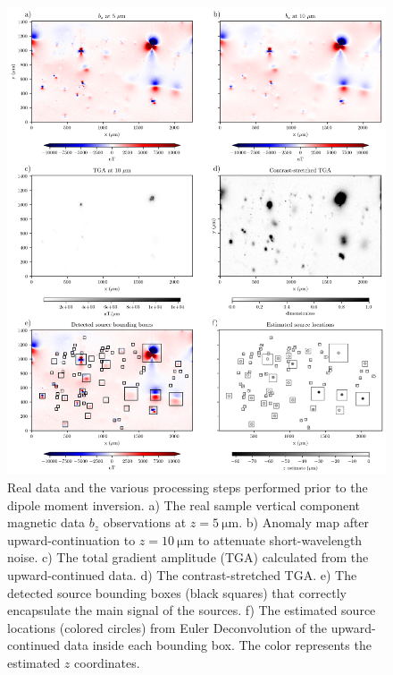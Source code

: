 \begin{figure}[ph!]
\centering
\includegraphics[width=1\linewidth]{figures/real-data.png}
\caption{Real data and the various processing steps performed prior to the dipole moment inversion.
    a) The real sample vertical component magnetic data $b_z$ observations at
    $z = \qty{5}{\um}$.
    b) Anomaly map after upward-continuation to $z = \qty{10}{\um}$ to attenuate short-wavelength noise.
    c) The total gradient amplitude (TGA) calculated from the
    upward-continued data.
    d) The contrast-stretched TGA.
    e) The detected source bounding boxes (black squares) that correctly
    encapsulate the main signal of the sources.
    f) The estimated source locations (colored circles) from Euler
    Deconvolution of the upward-continued data inside each bounding box.
    The color represents the estimated $z$ coordinates.
  }
\label{real-data}
\end{figure}


